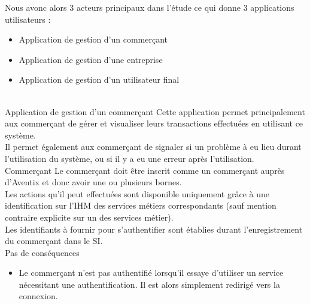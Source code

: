 Nous avonc alors 3 acteurs principaux dans l'étude ce qui donne 3 applications
utilisateurs : \\
\begin{itemize}
  \item Application de gestion d'un commerçant
  \item Application de gestion d'une entreprise
  \item Application de gestion d'un utilisateur final
\end{itemize}
~\\

\CUBref
{Application de gestion d'un commerçant}
{
  Cette application permet principalement aux commerçant de gérer et visualiser
  leurs transactions effectuées en utilisant ce système. \\
  
  Il permet également aux commerçant de signaler si un problème à eu lieu
  durant l'utilisation du système, ou si il y a eu une erreur après
  l'utilisation. \\
}
{Commerçant}
{
  Le commerçant doit être inscrit comme un commerçant auprès d'Aventix et donc
  avoir une ou plusieurs bornes. \\

  Les actions qu'il peut effectuées sont disponible uniquement grâce à une
  identification sur l'IHM des services métiers correspondants (sauf mention
  contraire explicite sur un des services métier). \\

  Les identifiants à fournir pour s'authentifier sont établies durant
  l'enregistrement du commerçant dans le SI. \\
}
{Pas de conséquences}
{
  \begin{itemize}
    \item Le commerçant n'est pas authentifié lorsqu'il essaye d'utiliser un
      service nécessitant une authentification. Il est alors simplement redirigé
      vers la connexion.
  \end{itemize}
}

% 

